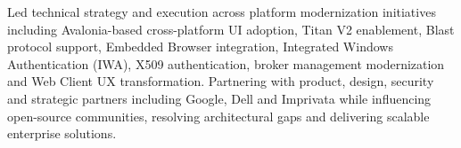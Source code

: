 \documentclass{avi}
\begin{document}
{\smallskip
{}
     Led technical strategy and execution across platform modernization initiatives including Avalonia-based cross-platform UI adoption, Titan V2 enablement, Blast protocol support, Embedded Browser integration, Integrated Windows Authentication (IWA), X509 authentication, broker management modernization and Web Client UX transformation. Partnering with product, design, security and strategic partners including Google, Dell and Imprivata while influencing open-source communities, resolving architectural gaps and delivering scalable enterprise solutions.

\smallskip\smallskip\smallskip\smallskip
\smallskip\smallskip\smallskip\smallskip
\smallskip\smallskip\smallskip\smallskip
\smallskip\smallskip\smallskip\smallskip
\smallskip\smallskip\smallskip\smallskip
\smallskip\smallskip\smallskip\smallskip

}  
\end{document}
